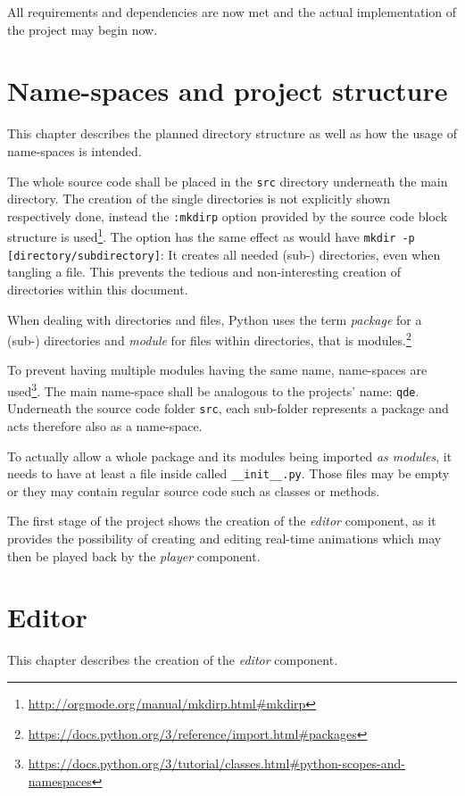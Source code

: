 \documentclass[10pt, openright, notitlepage]{scrreprt}
\begin{document}
All requirements and dependencies are now met and the actual implementation of
the project may begin now.
\section{Name-spaces and project structure}
\label{sec:org8b9ac01}
This chapter describes the planned directory structure as well as how the usage
of name-spaces is intended.

The whole source code shall be placed in the \texttt{src} directory underneath the main
directory. The creation of the single directories is not explicitly shown
respectively done, instead the \texttt{:mkdirp} option provided by the source code
block structure is used\footnote{\url{http://orgmode.org/manual/mkdirp.html\#mkdirp}}. The
option has the same effect as would have \texttt{mkdir -p [directory/subdirectory]}: It
creates all needed (sub-) directories, even when tangling a file. This prevents
the tedious and non-interesting creation of directories within this document.

When dealing with directories and files, Python uses the term \emph{package} for a
(sub-) directories and \emph{module} for files within directories, that is
modules.\footnote{\url{https://docs.python.org/3/reference/import.html\#packages}}

To prevent having multiple modules having the same name, name-spaces are
used\footnote{\url{https://docs.python.org/3/tutorial/classes.html\#python-scopes-and-namespaces}}.
The main name-space shall be analogous to the projects' name: \texttt{qde}. Underneath
the source code folder \texttt{src}, each sub-folder represents a package and acts
therefore also as a name-space.

To actually allow a whole package and its modules being imported \emph{as modules},
it needs to have at least a file inside called \texttt{\_\_init\_\_.py}. Those files may be
empty or they may contain regular source code such as classes or methods.

The first stage of the project shows the creation of the \emph{editor} component, as
it provides the possibility of creating and editing real-time animations which
may then be played back by the \emph{player} component\cite[p. 29]{osterwalder_qde_2016}.
\section{Editor}
\label{sec:org36222e4}
This chapter describes the creation of the \emph{editor} component.
\end{document}
